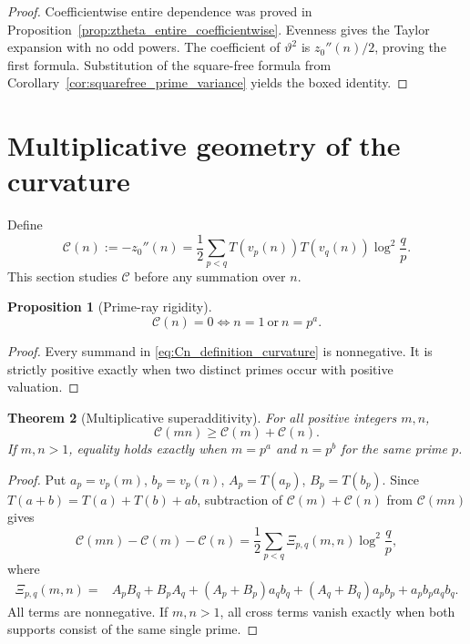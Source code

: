 \documentclass[11pt]{amsart}
\numberwithin{equation}{section}
\theoremstyle{plain}
\newtheorem{theorem}{Theorem}[section]
\newtheorem{proposition}[theorem]{Proposition}
\theoremstyle{definition}
\theoremstyle{remark}
\begin{document}
\begin{proof}
Coefficientwise entire dependence was proved in
Proposition~\ref{prop:ztheta_entire_coefficientwise}.  Evenness gives the Taylor
expansion with no odd powers.  The coefficient of \(\vartheta^2\) is
\(z_0''(n)/2\), proving the first formula.  Substitution of the square-free
formula from Corollary~\ref{cor:squarefree_prime_variance} yields the boxed
identity.
\end{proof}

\section{Multiplicative geometry of the curvature}
\label{sec:curvature_multiplicative_geometry}

Define
\begin{equation}
\mathcal C(n):=-z_0''(n)
=\frac12\sum_{p<q}T(v_p(n))T(v_q(n))\log^2\frac qp.
\label{eq:Cn_definition_curvature}
\end{equation}
This section studies \(\mathcal C\) before any summation over \(n\).

\begin{proposition}[Prime-ray rigidity]
\label{prop:curvature_prime_ray_rigidity}
\begin{equation}
\boxed{\mathcal C(n)=0\iff n=1\ \text{or}\ n=p^a.}
\label{eq:curvature_zero_prime_ray}
\end{equation}
\end{proposition}

\begin{proof}
Every summand in \eqref{eq:Cn_definition_curvature} is nonnegative.  It is
strictly positive exactly when two distinct primes occur with positive
valuation.
\end{proof}

\begin{theorem}[Multiplicative superadditivity]
\label{thm:curvature_superadditivity}
For all positive integers \(m,n\),
\begin{equation}
\boxed{\mathcal C(mn)\ge \mathcal C(m)+\mathcal C(n).}
\label{eq:curvature_superadditivity}
\end{equation}
If \(m,n>1\), equality holds exactly when \(m=p^a\) and \(n=p^b\) for the
same prime \(p\).
\end{theorem}

\begin{proof}
Put \(a_p=v_p(m)\), \(b_p=v_p(n)\),
\(A_p=T(a_p)\), \(B_p=T(b_p)\).  Since
\(T(a+b)=T(a)+T(b)+ab\), subtraction of
\(\mathcal C(m)+\mathcal C(n)\) from \(\mathcal C(mn)\) gives
\begin{equation}
\mathcal C(mn)-\mathcal C(m)-\mathcal C(n)
=\frac12\sum_{p<q}\Xi_{p,q}(m,n)\log^2\frac qp,
\label{eq:curvature_superadditivity_expansion}
\end{equation}
where
\begin{align}
\Xi_{p,q}(m,n)={}&A_pB_q+B_pA_q
 +(A_p+B_p)a_qb_q +(A_q+B_q)a_pb_p
 +a_pb_p a_qb_q.
\label{eq:Xi_pq_definition}
\end{align}
All terms are nonnegative.  If \(m,n>1\), all cross terms vanish exactly
when both supports consist of the same single prime.
\end{proof}
\end{document}
